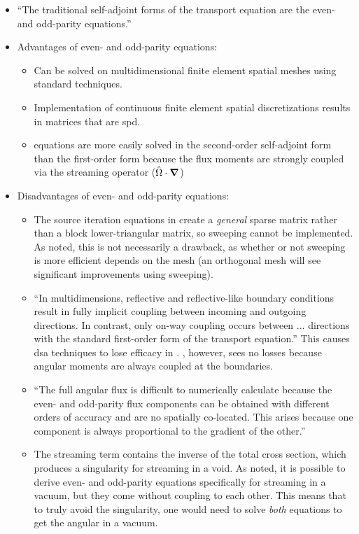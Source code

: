 \begin{itemize}
    \item ``The traditional self-adjoint forms of the transport equation are the even- and odd-parity equations.''
    \item Advantages of even- and odd-parity equations:
          \begin{itemize}
              \item Can be solved on multidimensional finite element spatial meshes using standard techniques.
              \item Implementation of continuous finite element spatial discretizations results in matrices that are \gls{spd}.
              \item \Pn equations are more easily solved in the second-order self-adjoint form than the first-order form because the flux moments are strongly coupled via the streaming operator ($\hat{\Omega}\cdot\grad$)
          \end{itemize}
    \item Disadvantages of even- and odd-parity equations:
          \begin{itemize}
              \item The source iteration equations in \Sn create a \textit{general} sparse matrix rather than a block lower-triangular matrix, so sweeping cannot be implemented. As noted, this is not necessarily a drawback, as whether or not sweeping is more efficient depends on the mesh (an orthogonal mesh will see significant improvements using sweeping).
              \item ``In multidimensions, reflective and reflective-like boundary conditions result in fully implicit coupling between incoming and outgoing directions. In contrast, only on-way coupling occurs between ... directions with the standard first-order form of the transport equation.'' This causes \gls{dsa} techniques to lose efficacy in \Sn. \Pn, however, sees no losses because angular moments are always coupled at the boundaries.
              \item ``The full angular flux is difficult to numerically calculate because the even- and odd-parity flux components can be obtained with different orders of accuracy and are no spatially co-located. This arises because one component is always proportional to the gradient of the other.''
              \item The streaming term contains the inverse of the total cross section, which produces a singularity for streaming in a void. As noted, it is possible to derive even- and odd-parity equations specifically for streaming in a vacuum, but they come without coupling to each other. This means that to truly avoid the singularity, one would need to solve \textit{both} equations to get the angular in a vacuum.

\end{itemize}
\end{itemize}
